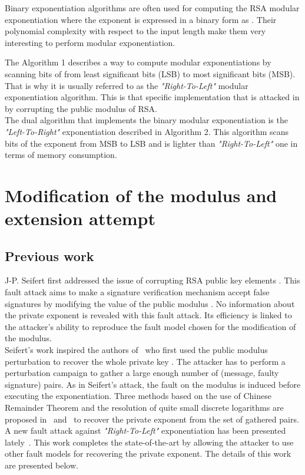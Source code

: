 \documentclass{article}
\begin{document}
Binary exponentiation algorithms are often used for computing the RSA modular exponentiation  where the exponent  is expressed in a binary form as . Their polynomial complexity with respect to the input length make them very interesting to perform modular exponentiation.


The Algorithm 1 describes a way to compute modular exponentiations by
scanning bits of  from least significant bits (LSB) to most
significant bits (MSB). That is why it is usually referred to as the \textit{"Right-To-Left"} modular exponentiation algorithm. This is that specific implementation that is attacked in \cite{77} by corrupting the public modulus of RSA.\\
\indent
The dual algorithm that implements the binary modular exponentiation is 
the \textit{"Left-To-Right"} exponentiation described in Algorithm 2. This algorithm scans bits of the exponent from MSB to LSB and is lighter than \textit{"Right-To-Left"} one in terms of memory consumption.

\section{Modification of the modulus and extension attempt}
\subsection{Previous work}
J-P. Seifert first addressed the issue of corrupting RSA public key elements \cite{67,13}. This fault attack 
aims to make a signature verification mechanism accept false signatures by modifying the value of the public modulus . No information about the private exponent  is revealed with this fault attack.
Its efficiency is linked to the attacker's ability to reproduce the fault model chosen for the modification of the modulus.\\
\indent
Seifert's work inspired the authors of~\cite{6} who first used the public modulus perturbation to recover the whole private key . The attacker has to perform a perturbation campaign to gather a large enough number of (message, faulty signature) pairs. As in Seifert's attack, the fault on the modulus is induced before executing the exponentiation. Three methods based on the use of Chinese Remainder Theorem and the resolution of quite small discrete logarithms are proposed in~\cite{6} and~\cite{59} to recover the private exponent from the set of gathered pairs.\\
\indent
A new fault attack against \textit{"Right-To-Left"} exponentiation has been presented lately~\cite{77}.
This work completes the state-of-the-art by allowing the attacker to use other fault models for recovering the private exponent. The details of this work are presented below.
\end{document}
